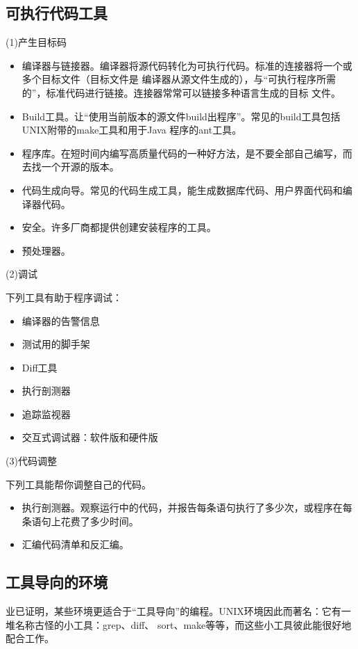 \documentclass{article}
\begin{document}
\subsection{可执行代码工具}
\par
(1)产生目标码
\par
\begin{itemize}
    \item 编译器与链接器。编译器将源代码转化为可执行代码。标准的连接器将一个或多个目标文件（目标文件是
    编译器从源文件生成的），与“可执行程序所需的”，标准代码进行链接。连接器常常可以链接多种语言生成的目标
    文件。
    \item Build工具。让“使用当前版本的源文件build出程序”。常见的build工具包括UNIX附带的make工具和用于Java
    程序的ant工具。
    \item 程序库。在短时间内编写高质量代码的一种好方法，是不要全部自己编写，而去找一个开源的版本。
    \item 代码生成向导。常见的代码生成工具，能生成数据库代码、用户界面代码和编译器代码。
    \item 安全。许多厂商都提供创建安装程序的工具。
    \item 预处理器。
\end{itemize}

\par
(2)调试
\par
下列工具有助于程序调试：
\begin{itemize}
    \item 编译器的告警信息
    \item 测试用的脚手架
    \item Diff工具
    \item 执行剖测器
    \item 追踪监视器
    \item 交互式调试器：软件版和硬件版
\end{itemize}

\par
(3)代码调整
\par
下列工具能帮你调整自己的代码。
\begin{itemize}
    \item 执行剖测器。观察运行中的代码，并报告每条语句执行了多少次，或程序在每条语句上花费了多少时间。
    \item 汇编代码清单和反汇编。
\end{itemize}

\subsection{工具导向的环境}
业已证明，某些环境更适合于“工具导向”的编程。UNIX环境因此而著名：它有一堆名称古怪的小工具：grep、diff、
sort、make等等，而这些小工具彼此能很好地配合工作。
\end{document}

